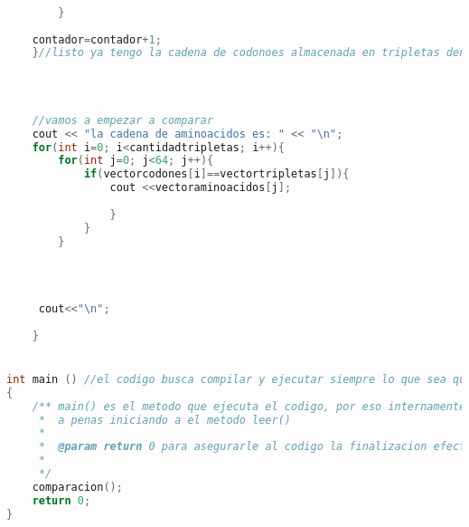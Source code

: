 \documentclass[12pt,letterpaper]{report}
\begin{document}
\begin{lstlisting}[language=c++]
		
		
		}
		
	contador=contador+1;	
	}//listo ya tengo la cadena de codonoes almacenada en tripletas dentro del vector "vectorcodones"
	
	
	
	
	//vamos a empezar a comparar
	cout << "la cadena de aminoacidos es: " << "\n";
	for(int i=0; i<cantidadtripletas; i++){
		for(int j=0; j<64; j++){
			if(vectorcodones[i]==vectortripletas[j]){
				cout <<vectoraminoacidos[j];
				
				}
			}
		}
	
   
	
	 
     cout<<"\n";
	
	}


int main () //el codigo busca compilar y ejecutar siempre lo que sea que tenga main()
{
	/** main() es el metodo que ejecuta el codigo, por eso internamente ejecutara el metodo de comparacion() que a su vez llama 
	 *  a penas iniciando a el metodo leer()
	 * 
	 *  @param return 0 para asegurarle al codigo la finalizacion efectiva de la ejecucion del metodo.
	 * 
	 */
    comparacion();
    return 0;
}


\end{lstlisting}
\end{document}
